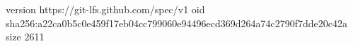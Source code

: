 version https://git-lfs.github.com/spec/v1
oid sha256:a22ca0b5c0e459f17eb04cc799060e94496ecd369d264a74c2790f7dde20c42a
size 2611
